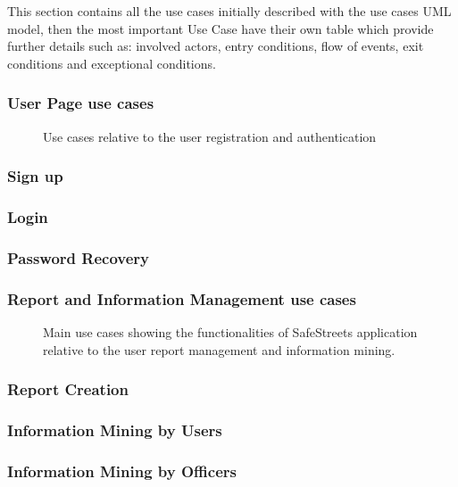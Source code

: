 This section contains all the use cases initially described with the use cases UML model, then the most important Use Case have their own table which provide further details such as: involved actors, entry conditions, flow of events,  exit conditions and exceptional conditions.

\subsubsection{User Page use cases}
\begin{figure}[htp] 
\caption{Use cases relative to the user registration and authentication} 
\label{fig:userpage} 
\end{figure} 

\newpage
\subsubsection{Sign up}

\newpage
\subsubsection{Login}

\newpage
\subsubsection{Password Recovery}



\newpage
\subsubsection{Report and Information Management use cases}
\begin{figure}[htp] 
	\caption{Main use cases showing the functionalities of SafeStreets application relative to the user report management and information mining.} 
	\label{fig:reportmanagement} 
\end{figure}

\newpage
\subsubsection{Report Creation}

\newpage
\subsubsection{Information Mining by Users}

\newpage
\subsubsection{Information Mining by Officers}

\newpage


